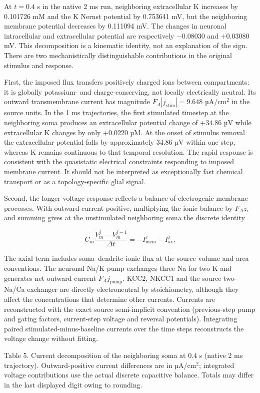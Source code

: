 \documentclass[
  11pt,
]{article}
\begin{document}
At \(t=0.4\) s in the native 2 ms run, neighboring extracellular K
increases by 0.101726 mM and the K Nernst potential by 0.753641 mV, but
the neighboring membrane potential decreases by 0.111094 mV. The changes
in neuronal intracellular and extracellular potential are respectively
\(-0.08030\) and \(+0.03080\) mV. This decomposition is a kinematic
identity, not an explanation of the sign. There are two mechanistically
distinguishable contributions in the original stimulus and response.

First, the imposed flux transfers positively charged ions between
compartments: it is globally potassium- and charge-conserving, not
locally electrically neutral. Its outward transmembrane current has
magnitude \(F_{\!A}|j_{\mathrm{stim}}|=9.648\) µA/cm\(^2\) in the source
units. In the 1 ms trajectories, the first stimulated timestep at the
neighboring soma produces an extracellular potential change of
\(+34.86\) µV while extracellular K changes by only \(+0.0220\) µM. At
the onset of stimulus removal the extracellular potential falls by
approximately 34.86 µV within one step, whereas K remains continuous to
that temporal resolution. The rapid response is consistent with the
quasistatic electrical constraints responding to imposed membrane
current. It should not be interpreted as exceptionally fast chemical
transport or as a topology-specific glial signal.

Second, the longer voltage response reflects a balance of electrogenic
membrane processes. With outward current positive, multiplying the ionic
balance by \(F_{\!A}z_i\) and summing gives at the unstimulated
neighboring soma the discrete identity

\[C_m\frac{V_m^j-V_m^{j-1}}{\Delta t}=-I_{\mathrm{mem}}^{j}-I_{\mathrm{ax}}^{j}.\]

The axial term includes soma--dendrite ionic flux at the source volume
and area conventions. The neuronal Na/K pump exchanges three Na for two
K and generates net outward current \(F_{\!A}j_{\mathrm{pump}}\). KCC2,
NKCC1 and the source two-Na/Ca exchanger are directly electroneutral by
stoichiometry, although they affect the concentrations that determine
other currents. Currents are reconstructed with the exact source
semi-implicit convention (previous-step pump and gating factors,
current-step voltage and reversal potentials). Integrating paired
stimulated-minus-baseline currents over the time steps reconstructs the
voltage change without fitting.

Table 5. Current decomposition of the neighboring soma at 0.4 s (native
2 ms trajectory). Outward-positive current differences are in
µA/cm\(^2\); integrated voltage contributions use the actual discrete
capacitive balance. Totals may differ in the last displayed digit owing
to rounding.
\end{document}
